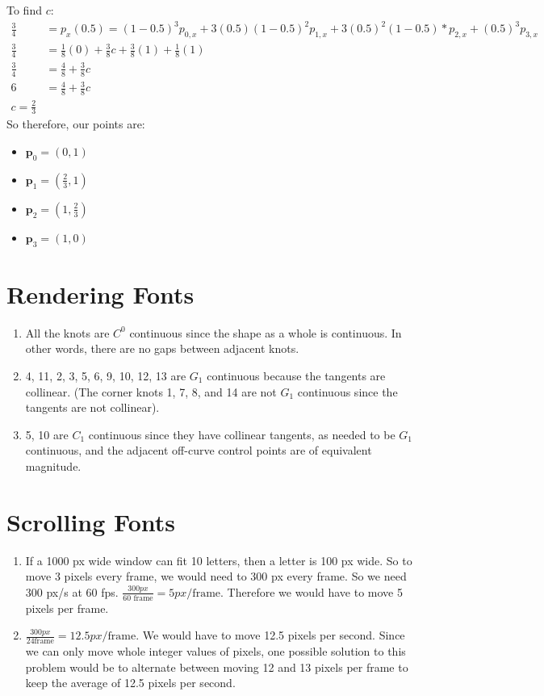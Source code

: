 \documentclass[12p]{article}
\theoremstyle{definition}
\newcounter{problem}
\newcounter{solution}
\begin{document}
\begin{enumerate}[label=\Alph*)]
    To find $c$:
    \begin{align*}
      \frac{3}{4} &= p_x (0.5) = (1 - 0.5)^3 p_{0,x} + 3(0.5)(1 - 0.5)^2 p_{1,x} + 3(0.5)^2(1 - 0.5)*p_{2, x} + (0.5)^3 p_{3,x}\\
      \frac{3}{4} &= \frac{1}{8}(0) + \frac{3}{8}c + \frac{3}{8}(1) + \frac{1}{8}(1)\\
      \frac{3}{4} &= \frac{4}{8} + \frac{3}{8}c \\
      6 &= \frac{4}{8} + \frac{3}{8}c \\
      c = \frac{2}{3}
    \end{align*}
    So therefore, our points are:
    \begin{itemize}
      \item $\textbf{p}_0 = (0, 1)$
      \item $\textbf{p}_1 = (\frac{2}{3}, 1)$
      \item $\textbf{p}_2 = (1, \frac{2}{3})$
      \item $\textbf{p}_3 = (1, 0)$
    \end{itemize}
\end{enumerate}

\section{Rendering Fonts}
\begin{enumerate}[label=\Alph*)]
  \item All the knots are $C^0$ continuous since the shape as a whole is
  continuous. In other words, there are no gaps between adjacent knots.
  \item 4, 11, 2, 3, 5, 6, 9, 10, 12, 13 are $G_1$ continuous because the
  tangents are collinear. (The corner knots 1, 7, 8, and 14 are not $G_1$
  continuous since the tangents are not collinear).
  \item 5, 10 are $C_1$ continuous since they have collinear tangents, as needed
  to be $G_1$ continuous, and the adjacent off-curve control points are of
  equivalent magnitude.
\end{enumerate}

\section{Scrolling Fonts}
\begin{enumerate}[label=\Alph*)]
  \item If a 1000 px wide window can fit 10 letters, then a letter is 100 px
  wide. So to move 3 pixels every frame, we would need to 300 px every frame. So
  we need 300 px/s at 60 fps. $\frac{300 px}{60 \text{ frame}} = 5
  px/\text{frame}$. Therefore we would have to move 5 pixels per frame.
  \item $\frac{300 px}{24\text{frame}} = 12.5 px/\text{frame}$. We would have to
  move 12.5 pixels per second. Since we can only move whole integer values of
  pixels, one possible solution to this problem would be to alternate between
  moving 12 and 13 pixels per frame to keep the average of 12.5 pixels per
  second.
\end{enumerate}

%
\end{document}
